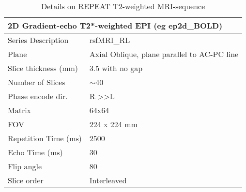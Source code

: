 \documentclass[
	a4paper, 
	11.5pt,
	headings=small, 
	twoside, 
	titlepage=firstiscover, 
 	pagesize=auto,
  	version=last,
	open=any,
	BCOR=14mm,
  	chapterprefix=false]{scrbook}
\begin{document}
\begin{table}[H]
\caption{Details on REPEAT T2-weighted \ac{MRI}-sequence}
\begin{tabularx}{1\textwidth}{@{}X *{1}{X}@{}}
\toprule
\multicolumn{2}{l}{\textbf{2D Gradient-echo T2*-weighted \ac{EPI} (eg ep2d\_BOLD)}} \\
\midrule                                                                                                                                                                                                                                                                                                                                                                                                                                                                                                                                                                                                                                                                                                                          
Series Description                                				& rsfMRI\_RL                                  \\
Plane                                             					& Axial Oblique, plane parallel to AC-PC line \\
Slice thickness (mm)                              				& 3.5 with no gap                             \\
Number of Slices                                  				& $\sim$40                                    \\
Phase encode dir.                                 				& R \textgreater{}\textgreater L              \\
Matrix                                            					& 64x64                                       \\
FOV                                               						& 224 x 224 mm                                \\
Repetition Time (ms)                              				& 2500                                        \\
Echo Time (ms)                                    				& 30                                          \\
Flip angle                                        					& 80                                          \\
Slice order                                       					& Interleaved                                 \\

\end{tabularx}
\end{table}
\end{document}
